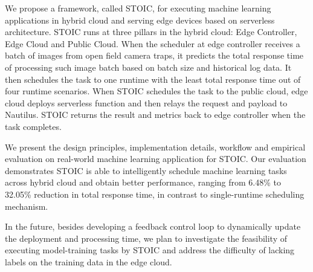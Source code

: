 We propose a framework, called STOIC, for executing machine learning applications in hybrid cloud and serving edge devices based on serverless architecture. STOIC runs at three pillars in the hybrid cloud: Edge Controller, Edge Cloud and Public Cloud. When the scheduler at edge controller receives a batch of images from open field camera traps, it predicts the total response time of processing such image batch based on batch size and historical log data. It then schedules the task to one runtime with the least total response time out of four runtime scenarios. When STOIC schedules the task to the public cloud, edge cloud deploys serverless function and then relays the request and payload to Nautilus. STOIC returns the result and metrics back to edge controller when the task completes.

We present the design principles, implementation details, workflow and empirical evaluation on real-world machine learning application for STOIC. Our evaluation demonstrates STOIC is able to intelligently schedule machine learning tasks across hybrid cloud and obtain better performance, ranging from 6.48\% to 32.05\% reduction in total response time, in contrast to single-runtime scheduling mechanism.

In the future, besides developing a feedback control loop to dynamically update the deployment and processing time, we plan to investigate the feasibility of executing model-training tasks by STOIC and address the difficulty of lacking labels on the training data in the edge cloud.